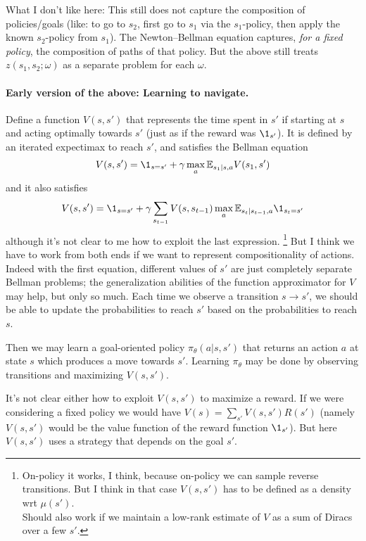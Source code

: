 \documentclass[11pt,a4paper]{article}
\begin{document}
What I don't like here: This still does not capture the composition of
policies/goals (like: to go to $s_2$, first go to $s_1$ via the
$s_1$-policy, then apply the known $s_2$-policy from $s_1$). The
Newton--Bellman equation captures, \emph{for a fixed policy}, the
composition of paths of that policy. But the above still treats
$z(s_1,s_2;\omega)$ as a separate problem for each $\omega$.

\paragraph{Early version of the above: Learning to navigate.} Define a function $V(s,s')$ that
represents the time spent in $s'$ if starting at $s$ and acting optimally
towards $s'$ (just as if the reward was $\1_{s'}$). It is defined by an iterated expectimax to reach $s'$, and
satisfies the Bellman equation
\begin{equation}
\label{eq:optleftbellman}
V(s,s')=\1_{s=s'}+\gamma \max_a \E_{s_1|s,a} V(s_1,s')
\end{equation}
and it also satisfies
\begin{equation}
\label{eq:optrightbellman}
V(s,s')=\1_{s=s'}+\gamma \sum_{s_{t-1}} V(s,s_{t-1})\max_a
\E_{s_t|s_{t-1},a}\1_{s_t=s'}
\end{equation}
although it's not clear to me how to exploit the last expression. 
\footnote{On-policy it works, I think, because on-policy we can sample
reverse transitions. But I think in that case $V(s,s')$ has to be defined
as a density wrt $\mu(s')$.\\Should also work if we maintain a low-rank
estimate of $V$ as a sum of Diracs over a few $s'$.}
But I
think we have to work from both ends if we want to represent
compositionality of actions. Indeed with the first equation, different values
of $s'$ are just completely separate Bellman problems; the generalization
abilities of the function approximator for $V$ may help, but only so
much. Each time we observe a transition $s\to s'$, we should be able to
update the probabilities to reach $s'$ based on the probabilities to
reach $s$.

Then we may learn a goal-oriented policy $\pi_\theta(a|s,s')$ that returns an
action $a$ at state $s$ which produces a move towards $s'$. Learning
$\pi_\theta$ may be done by observing transitions and maximizing
$V(s,s')$.

It's not clear either how to exploit $V(s,s')$ to maximize a reward. If
we were considering a fixed policy we would have
$V(s)=\sum_{s'}V(s,s')R(s')$ (namely $V(s,s')$ would be the value
function of the reward function $\1_{s'}$). But here $V(s,s')$ uses a
strategy that depends on the goal $s'$.
\end{document}
